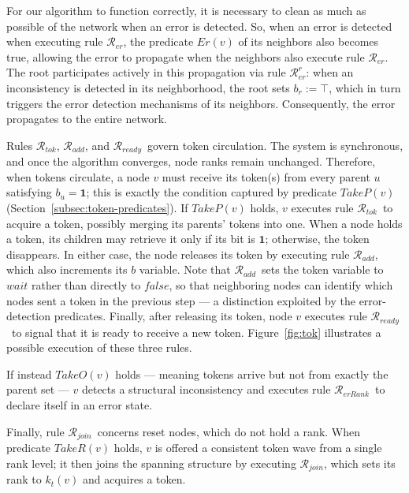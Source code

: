 \documentclass[a4paper, 12pt]{article}
\newcommand{\bo}{\mathbf{1}}
\newcommand{\rk}{k}
\newcommand{\Rer}{$\mathscr{R}_{er}$}
\newcommand{\RerRank}{$\mathscr{R}_{erRank}$}
\newcommand{\Rjoin}{$\mathscr{R}_{join}$}
\newcommand{\Rtok}{$\mathscr{R}_{tok}$}
\newcommand{\Radd}{$\mathscr{R}_{add}$}
\newcommand{\Rready}{$\mathscr{R}_{ready}$}
\newcommand{\RerRoot}{$\mathscr{R}^r_{er}$}
\begin{document}
 For our algorithm to function correctly, it is necessary to clean as much 
as possible of the network when an error is detected. So, when an error is 
detected when executing rule \Rer, the predicate $Er(v)$ of its neighbors 
also becomes true, allowing the error to propagate when the neighbors also 
execute rule \Rer. The root participates actively in this propagation via 
rule \RerRoot: when an inconsistency is detected in its neighborhood, the 
root sets $b_r := \top$, which in turn triggers the error detection 
mechanisms of its neighbors. Consequently, the error propagates to the 
entire network.

Rules \Rtok, \Radd, and \Rready\ govern token circulation. The system is synchronous, 
and once the algorithm converges, node ranks remain unchanged. Therefore, when tokens 
circulate, a node $v$ must receive its token(s) from every parent $u$ satisfying 
$b_u = \bo$; this is exactly the condition captured by predicate $\mathit{TakeP}(v)$ 
(Section~\ref{subsec:token-predicates}). If $\mathit{TakeP}(v)$ holds, $v$ executes 
rule \Rtok\ to acquire a token, possibly merging its parents' tokens into one. When a 
node holds a token, its children may retrieve it only if its bit is $\bo$; otherwise, 
the token disappears. In either case, the node releases its token by executing rule 
\Radd, which also increments its $b$ variable. Note that \Radd\ sets the token variable 
to $\mathit{wait}$ rather than directly to $\mathit{false}$, so that neighboring nodes 
can identify which nodes sent a token in the previous step — a distinction exploited by 
the error-detection predicates. Finally, after releasing its token, node $v$ executes 
rule \Rready\ to signal that it is ready to receive a new token. 
Figure~\ref{fig:tok} illustrates a possible execution of these three rules.

If instead $\mathit{TakeO}(v)$ holds — meaning tokens arrive but not from exactly the 
parent set — $v$ detects a structural inconsistency and executes rule \RerRank\ to 
declare itself in an error state.

Finally, rule \Rjoin\ concerns reset nodes, which do not hold a rank. When predicate 
$\mathit{TakeR}(v)$ holds, $v$ is offered a consistent token wave from a single rank 
level; it then joins the spanning structure by executing \Rjoin, which sets its rank to 
$\rk_t(v)$ and acquires a token.
\end{document}
